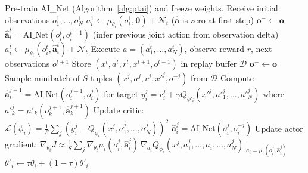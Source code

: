 \documentclass[12pt]{article}
\begin{document}
\begin{algorithm}[H]
\caption{MADDPG with Pre-Trained Action Inference (MADDPG+PTAI) for $N$ agents}
\label{alg:maddpg_ptai}
\begin{algorithmic}[1]
\State Pre-train AI\_Net (Algorithm~\ref{alg:ptai}) and freeze weights.
  \State Receive initial observations $o^1_1, \ldots, o^1_N$
    \State $a^1_i \leftarrow \mu_{\theta_i}(o^1_i, \mathbf{0}) + \mathcal{N}_t$
           \quad ($\widehat{\mathbf{a}}$ is zero at first step)
  \EndFor
  \State $\mathbf{o}^- \leftarrow \mathbf{o}$
      \State $\widehat{\mathbf{a}}^t_i = \text{AI\_Net}(o^t_i, o^{t-1}_i)$
             \quad (infer previous joint action from observation delta)
      \State $a^t_i \leftarrow \mu_{\theta_i}(o^t_i, \widehat{\mathbf{a}}^t_i) + \mathcal{N}_t$
    \EndFor
    \State Execute $a = (a^t_1, \ldots, a^t_N)$, observe reward $r$, next observations $o^{t+1}$
    \State Store $(x^t, a^t, r^t, x^{t+1}, o^{t-1})$ in replay buffer $\mathcal{D}$
    \State $\mathbf{o}^- \leftarrow \mathbf{o}$
      \State Sample minibatch of $S$ tuples $(x^j, a^j, r^j, x'^j, o^{-j})$ from $\mathcal{D}$
      \State Compute $\widehat{\mathbf{a}}^{j+1}_i = \text{AI\_Net}(o^{j+1}_i, o^j_i)$ for target
      \State $y^j_i = r^j_i + \gamma Q_{\phi'_i}(x'^j, a'^j_1, \ldots, a'^j_N)$
             where $a'^j_k = \mu'_k(o^{j+1}_k, \widehat{\mathbf{a}}^{j+1}_k)$
      \State Update critic: $\mathcal{L}(\phi_i) = \frac{1}{S}\sum_j (y^j_i - Q_{\phi_i}(x^j, a^j_1, \ldots, a^j_N))^2$
      \State $\widehat{\mathbf{a}}^j_i = \text{AI\_Net}(o^j_i, o^{-j}_i)$
      \State Update actor gradient:
             $\nabla_{\theta_i} J \approx \frac{1}{S}\sum_j
             \nabla_{\theta_i}\mu_i(o^j_i, \widehat{\mathbf{a}}^j_i)\,
             \nabla_{a_i}Q_{\phi_i}(x^j, a^j_1, \ldots, a_i, \ldots, a^j_N)
             \big|_{a_i = \mu_i(o^j_i, \widehat{\mathbf{a}}^j_i)}$
    \EndFor
      \State $\theta'_i \leftarrow \tau\theta_i + (1-\tau)\theta'_i$
    \EndFor
  \EndFor
\EndFor
\end{algorithmic}
\end{algorithm}
\end{document}
